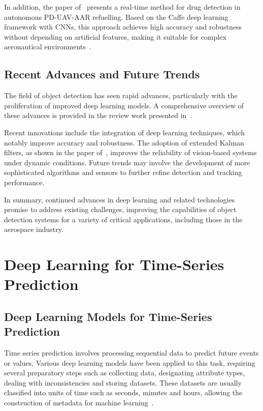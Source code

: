 \documentclass[12pt,oneside]{book} %
\begin{document}
In addition, the paper of~\citet{AARCNN} presents a real-time method for drug
detection in autonomous PD-UAV-AAR refuelling. Based on the Caffe deep learning
framework with CNNs, this approach achieves high accuracy and robustness
without depending on artificial features, making it suitable for complex
aeronautical environments~\cite{AARCNN}.

\subsection{Recent Advances and Future Trends}
The field of object detection has seen rapid advances, particularly with the
proliferation of improved deep learning models. A comprehensive overview of
these advances is provided in the review work presented
in~\cite{SurveyModernODModels}.

Recent innovations include the integration of deep learning techniques, which
notably improve accuracy and robustness. The adoption of extended Kalman
filters, as shown in the paper of~\citet{AAREKF}, improves the reliability of
vision-based systems under dynamic conditions. Future trends may involve the
development of more sophisticated algorithms and sensors to further refine
detection and tracking performance.

In summary, continued advances in deep learning and related technologies
promise to address existing challenges, improving the capabilities of object
detection systems for a variety of critical applications, including those in
the aerospace industry. 

\section{Deep Learning for Time-Series Prediction}
\subsection{Deep Learning Models for Time-Series Prediction}
Time series prediction involves processing sequential data to predict future
events or values. Various deep learning models have been applied to this task,
requiring several preparatory steps such as collecting data, designating
attribute types, dealing with inconsistencies and storing datasets. These
datasets are usually classified into units of time such as seconds, minutes and
hours, allowing the construction of metadata for machine
learning~\cite{FFPSpaceSystemVehicles}.
\end{document}
